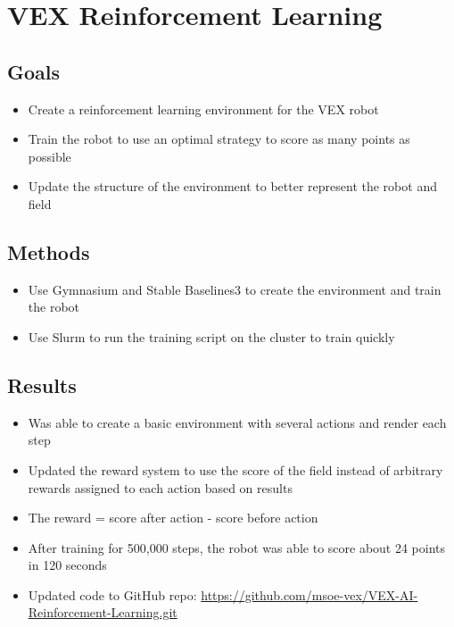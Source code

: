 \section{VEX Reinforcement Learning}

\subsection{Goals}
\begin{itemize}
    \item Create a reinforcement learning environment for the VEX robot
    \item Train the robot to use an optimal strategy to score as many points as possible
    \item Update the structure of the environment to better represent the robot and field
\end{itemize}

\subsection{Methods}
\begin{itemize}
    \item Use Gymnasium and Stable Baselines3 to create the environment and train the robot
    \item Use Slurm to run the training script on the cluster to train quickly
\end{itemize}

\subsection{Results}
\begin{itemize}
    \item Was able to create a basic environment with several actions and render each step
    \item Updated the reward system to use the score of the field instead of arbitrary rewards assigned to each action based on results
    \item The reward = score after action - score before action
    \item After training for 500,000 steps, the robot was able to score about 24 points in 120 seconds
    \item Updated code to GitHub repo: \href{https://github.com/msoe-vex/VEX-AI-Reinforcement-Learning.git}{https://github.com/msoe-vex/VEX-AI-Reinforcement-Learning.git}
\end{itemize}

